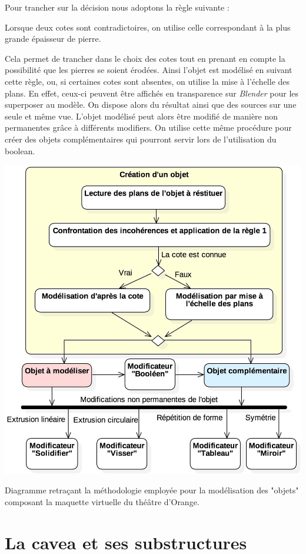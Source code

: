 %
Pour trancher sur la décision nous adoptons la règle suivante :
%
\begin{theo}\label{epaisseur}
	Lorsque deux cotes sont contradictoires, on utilise celle correspondant à la plus grande épaisseur de pierre.
\end{theo}
%
Cela permet de trancher dans le choix des cotes tout en prenant en compte la possibilité que les pierres se soient érodées. Ainsi l'objet est modélisé en suivant cette règle, ou, si certaines cotes sont absentes, on utilise la mise à l'échelle des plans. En effet, ceux-ci peuvent être affichés en transparence sur \textit{Blender} pour les superposer au modèle. On dispose alors du résultat ainsi que des sources sur une seule et même vue. L'objet modélisé peut alors être modifié de manière non permanentes grâce à différents \glspl{modifier}. On utilise cette même procédure pour créer des objets complémentaires qui pourront servir lors de l'utilisation du \gls{boolean}. 
%
\begin{figureth}
	\includegraphics[width=0.8\linewidth]{images/metodo}
	\caption{Diagramme retraçant la méthodologie employée pour la modélisation des "objets" composant la maquette virtuelle du théâtre d'Orange.} 
	\label{metodo} 
\end{figureth} 



\section{La  \gls{cavea} et ses substructures}  
	\label{La cavea et ses substructures}

